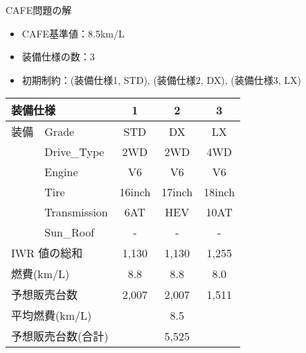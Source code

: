 \documentclass[dvipdfmx, 11pt]{beamer}
\begin{document}
\begin{frame}{CAFE問題の解}
 \begin{itemize}
  \item CAFE基準値：8.5km/L
  \item 装備仕様の数：3
  \item 初期制約：(装備仕様1, STD), (装備仕様2, DX), (装備仕様3, LX)
 \end{itemize}
 \begin{exampleblock}{}
  \centering
  \begin{tabular}{l|l|c|c|c} 
    \multicolumn{2}{l|}{装備仕様}               & 1	& 2 	 & 3	\\  \hline
    装備 & \textsf{Grade}        & \textsf{STD}    & \textsf{DX}     & \textsf{LX}\\
    &\textsf{Drive\_Type}  & \textsf{2WD}    & \textsf{2WD}    & \alert{4WD}\\
    &\textsf{Engine}	  & \alert{V6}     & \textsf{V6}     & \textsf{V6}\\
    &\textsf{Tire}	  & \textsf{16inch} & \textsf{17inch} & \textsf{18inch}\\
    &\textsf{Transmission} & \alert{6AT}    & \alert{HEV}    & \textsf{10AT}\\
    &\textsf{Sun\_Roof}    & -               & \alert{-} & -  \\ \hline
    \multicolumn{2}{l|}{IWR 値の総和}           & 1,130  & 1,130   & 1,255 \\ %
    \multicolumn{2}{l|}{燃費(km/L)}      & 8.8  & 8.8     & 8.0 \\ %
    \multicolumn{2}{l|}{予想販売台数}    & 2,007   & 2,007   & 1,511  \\ \hline
    \multicolumn{2}{l|}{平均燃費(km/L)}  & \multicolumn{3}{c}{8.5} \\ 
    \multicolumn{2}{l|}{予想販売台数(合計)}  & \multicolumn{3}{c}{5,525} \\ 
  \end{tabular}
 \end{exampleblock}
\end{frame}
\end{document}
